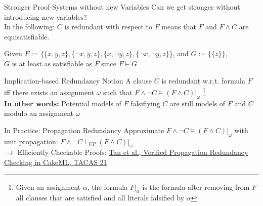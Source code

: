 \documentclass[t]{sdqbeamer}
\begin{document}
\begin{frame}{Stronger Proof-Systems without new Variables}
\vspace*{-1em}
Can we get stronger without introducing new variables?\\
In the following: $C$ is redundant with respect to $F$ means that $F$ and $F \land C$ are equisatisfiable.
\begin{example}
Given $F := \{\{x, y, z\}, \{\lnot x, y, z\}, \{x, \lnot y, z\}, \{\lnot x, \lnot y, z\}\}$, and $G := \{\{z\}\}$, \\
$G$ is at least as satisfiable as $F$ since $F \models G$
\end{example}
%
\begin{block}{Implication-based Redundancy Notion}
A clause $C$ is redundant w.r.t. formula $F$ iff there exists an assignment $\omega$ such that $F \land \lnot C \models (F \land C)|_\omega$%
\footnote{Given an assignment $\alpha$, the formula $F|_\alpha$ is the formula after removing from $F$ all clauses that are satisfied and all literals falsified by $\alpha$}
~\\[1ex]
\textbf{In other words:} Potential models of $F$ falsifiying $C$ are still models of $F$ and $C$ modulo an assignment $\omega$
\end{block}
%
\begin{block}{In Practice: Propagation Redundancy}
Approximate $F \land \lnot C \models (F \land C)|_\omega$ with unit propagation: $F \land \lnot C \vdash_{UP} (F \land C)|_\omega$\\[1ex]
$\rightarrow$ Efficiently Checkable Proofs: \href{https://cakeml.org/tacas21.pdf}{Tan et al., Verified Propagation Redundancy Checking in CakeML, TACAS 21}
\end{block}
\end{frame}
\end{document}
